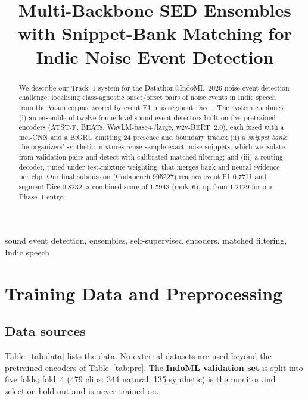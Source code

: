 \documentclass[conference]{IEEEtran}
\begin{document}
\title{Multi-Backbone SED Ensembles with Snippet-Bank Matching for Indic Noise Event Detection}

\author{
}

\maketitle

\begin{abstract}
We describe our Track~1 system for the Datathon@IndoML~2026 noise event detection challenge: localising
class-agnostic onset/offset pairs of noise events in Indic speech from the Vaani corpus, scored by event F1 plus
segment Dice~\cite{metrics}. The system combines (i) an ensemble of twelve frame-level sound event detectors built
on five pretrained encoders (ATST-F, BEATs, WavLM-base+/large, w2v-BERT~2.0), each fused with a mel-CNN and a
BiGRU emitting 24 presence and boundary tracks; (ii) a \emph{snippet bank}: the organizers' synthetic mixtures
reuse sample-exact noise snippets, which we isolate from validation pairs and detect with calibrated matched
filtering; and (iii) a routing decoder, tuned under test-mixture weighting, that merges bank and neural evidence
per clip. Our final submission (Codabench 995227) reaches event F1 0.7711 and segment Dice 0.8232, a combined score
of 1.5943 (rank~6), up from 1.2129 for our Phase~1 entry.
\end{abstract}

\begin{IEEEkeywords}
sound event detection, ensembles, self-supervised encoders, matched filtering, Indic speech
\end{IEEEkeywords}

\section{Training Data and Preprocessing}
\subsection{Data sources}
Table~\ref{tab:data} lists the data. No external datasets are used beyond the pretrained encoders of
Table~\ref{tab:pre}. The \textbf{IndoML validation set} is split into five folds; fold~4 (479 clips: 344 natural,
135 synthetic) is the monitor and selection hold-out and is never trained on.
\end{document}
